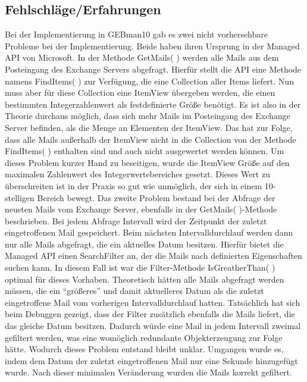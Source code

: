 \subsection{Fehlschläge/Erfahrungen}
\noindent
Bei der Implementierung in GEBman10 gab es zwei nicht vorhersehbare Probleme bei der Implementierung. Beide haben ihren Ursprung in der Managed API von Microsoft. In der Methode GetMails( ) werden alle Mails aus dem Posteingang des Exchange Servers abgefragt. Hierfür stellt die API eine Methode namens FindItems( ) zur Verfügung, die eine Collection aller Items liefert. Nun muss aber für diese Collection eine ItemView übergeben werden, die einen bestimmten Integerzahlenwert als festdefinierte Größe benötigt. Es ist also in der Theorie durchaus möglich, dass sich mehr Mails im Posteingang des Exchange Server befinden, als die Menge an Elementen der ItemView. Das hat zur Folge, dass alle Mails außerhalb der ItemView nicht in die Collection von der Methode FindItems( ) enthalten sind und auch nicht ausgewertet werden können. Um dieses Problem kurzer Hand zu beseitigen, wurde die ItemView Größe auf den maximalen Zahlenwert des Integerwertebereiches gesetzt. Dieses Wert zu überschreiten ist in der Praxis so gut wie unmöglich, der sich in einem 10-stelligen Bereich bewegt.\newline
Das zweite Problem bestand bei der Abfrage der neusten Mails vom Exchange Server, ebenfalls in der GetMails( )-Methode beschrieben. Bei jedem Abfrage Intervall wird der Zeitpunkt der zuletzt eingetroffenen Mail gespeichert. Beim nächsten Intervalldurchlauf werden dann nur alle Mails abgefragt, die ein aktuelles Datum besitzen. Hierfür bietet die Managed API einen SearchFilter an, der die Mails nach definierten Eigenschaften suchen kann. In diesem Fall ist war die Filter-Methode IsGreatherThan( ) optimal für dieses Vorhaben. Theoretisch hätten alle Mails abgefragt werden müssen, die ein \enquote{größeres} und damit aktuelleres Datum als die zuletzt eingetroffene Mail vom vorherigen Intervalldurchlauf hatten. Tatsächlich hat sich beim Debuggen gezeigt, dass der Filter zusätzlich ebenfalls die Mails liefert, die das gleiche Datum besitzen. Dadurch würde eine Mail in jedem Intervall zweimal gefiltert werden, was eine womöglich redundante Objekterzeugung zur Folge hätte. Wodurch dieses Problem entstand bleibt unklar. Umgangen wurde es, indem dem Datum der zuletzt eingetroffenen Mail nur eine Sekunde hinzugefügt wurde. Nach dieser minimalen Veränderung wurden die Mails korrekt gefiltert.


